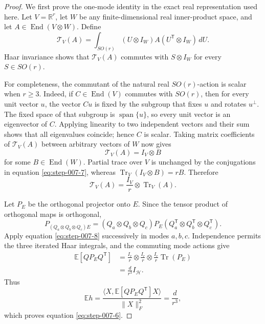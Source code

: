 \begin{proof}
We first prove the one-mode identity in the exact
real representation used here. Let \(V=\mathbb R^r\), let \(W\) be any
finite-dimensional real inner-product space, and let
\(A\in\operatorname{End}(V\otimes W)\). Define
\begin{equation}
  \mathcal T_V(A)
  =\int_{SO(r)}(U\otimes I_W)A(U^{\mathsf T}\otimes I_W)\,dU. \label{eq:step-007-7}
\end{equation}
Haar invariance shows that \(\mathcal T_V(A)\) commutes with
\(S\otimes I_W\) for every \(S\in SO(r)\).

For completeness, the commutant of the natural real \(SO(r)\)-action is
scalar when \(r\ge3\). Indeed, if \(C\in\operatorname{End}(V)\) commutes
with \(SO(r)\), then for every unit vector \(u\), the vector \(Cu\) is fixed
by the subgroup that fixes \(u\) and rotates \(u^\perp\). The fixed space of
that subgroup is \(\operatorname{span}\{u\}\), so every unit vector is an
eigenvector of \(C\). Applying linearity to two independent vectors and their
sum shows that all eigenvalues coincide; hence \(C\) is scalar. Taking matrix
coefficients of \(\mathcal T_V(A)\) between arbitrary vectors of \(W\) now
gives
\[
  \mathcal T_V(A)=I_V\otimes B
\]
for some \(B\in\operatorname{End}(W)\). Partial trace over \(V\) is unchanged
by the conjugations in equation \eqref{eq:step-007-7}, whereas
\(\operatorname{Tr}_V(I_V\otimes B)=rB\). Therefore
\begin{equation}
  \boxed{\mathcal T_V(A)
  =\frac{I_V}{r}\otimes\operatorname{Tr}_V(A).}             \label{eq:step-007-8}
\end{equation}

Let \(P_E\) be the orthogonal projector onto \(E\). Since the tensor product
of orthogonal maps is orthogonal,
\begin{equation}
  P_{(Q_a\otimes Q_b\otimes Q_c)E}
  =(Q_a\otimes Q_b\otimes Q_c)P_E
   (Q_a^{\mathsf T}\otimes Q_b^{\mathsf T}\otimes Q_c^{\mathsf T}). \label{eq:step-007-9}
\end{equation}
Apply equation \eqref{eq:step-007-8} successively in modes \(a,b,c\). Independence permits the
three iterated Haar integrals, and the commuting mode actions give
\begin{equation}
\begin{aligned}
  \mathbb E[QP_EQ^{\mathsf T}]
  &=\frac{I_r}{r}\otimes\frac{I_r}{r}\otimes\frac{I_r}{r}
    \operatorname{Tr}(P_E)\\
  &=\frac d{r^3}I_{\mathcal H}.
\end{aligned}\label{eq:step-007-10}
\end{equation}
Thus
\[
  \mathbb Eh
  =\frac{\langle X,\mathbb E[QP_EQ^{\mathsf T}]X\rangle}
         {\|X\|_F^2}
  =\frac d{r^3},
\]
which proves equation \eqref{eq:step-007-6}.


\end{proof}
